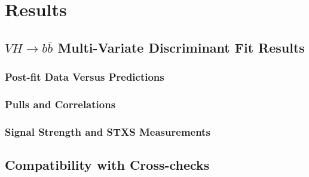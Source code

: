 \chapter{Results}%
\label{ch:results}
\section{\texorpdfstring{$VH \to b\bar{b}$}{VH->bb} Multi-Variate Discriminant Fit Results}%
\label{sec:mva-results}
\subsection{Post-fit Data Versus Predictions}







\subsection{Pulls and Correlations}

\subsection{Signal Strength and STXS Measurements}

\section{Compatibility with Cross-checks}

